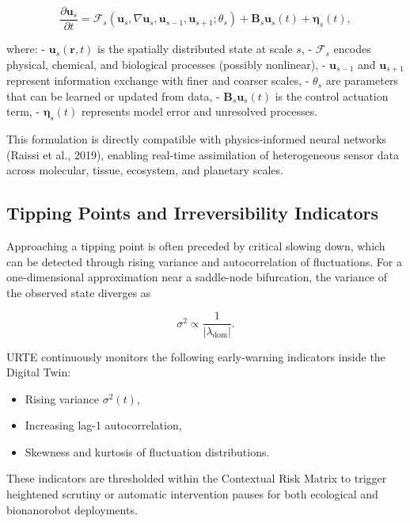 \documentclass[11pt,a4paper]{article}
\begin{document}
\begin{equation}
\frac{\partial \mathbf{u}_s}{\partial t} = \mathcal{F}_s(\mathbf{u}_s, \nabla \mathbf{u}_s, \mathbf{u}_{s-1}, \mathbf{u}_{s+1}; \theta_s) + \mathbf{B}_s \mathbf{u}_s(t) + \boldsymbol{\eta}_s(t),
\end{equation}

where:
- $\mathbf{u}_s(\mathbf{r}, t)$ is the spatially distributed state at scale $s$,
- $\mathcal{F}_s$ encodes physical, chemical, and biological processes (possibly nonlinear),
- $\mathbf{u}_{s-1}$ and $\mathbf{u}_{s+1}$ represent information exchange with finer and coarser scales,
- $\theta_s$ are parameters that can be learned or updated from data,
- $\mathbf{B}_s \mathbf{u}_s(t)$ is the control actuation term,
- $\boldsymbol{\eta}_s(t)$ represents model error and unresolved processes.

This formulation is directly compatible with physics-informed neural networks (Raissi et al., 2019), enabling real-time assimilation of heterogeneous sensor data across molecular, tissue, ecosystem, and planetary scales.

\subsection{Tipping Points and Irreversibility Indicators}

Approaching a tipping point is often preceded by critical slowing down, which can be detected through rising variance and autocorrelation of fluctuations. For a one-dimensional approximation near a saddle-node bifurcation, the variance of the observed state diverges as

\begin{equation}
\sigma^2 \propto \frac{1}{|\lambda_{\text{dom}}|}.
\end{equation}

URTE continuously monitors the following early-warning indicators inside the Digital Twin:

\begin{itemize}
    \item Rising variance $\sigma^2(t)$,
    \item Increasing lag-1 autocorrelation,
    \item Skewness and kurtosis of fluctuation distributions.
\end{itemize}

These indicators are thresholded within the Contextual Risk Matrix to trigger heightened scrutiny or automatic intervention pauses for both ecological and bionanorobot deployments.
\end{document}
